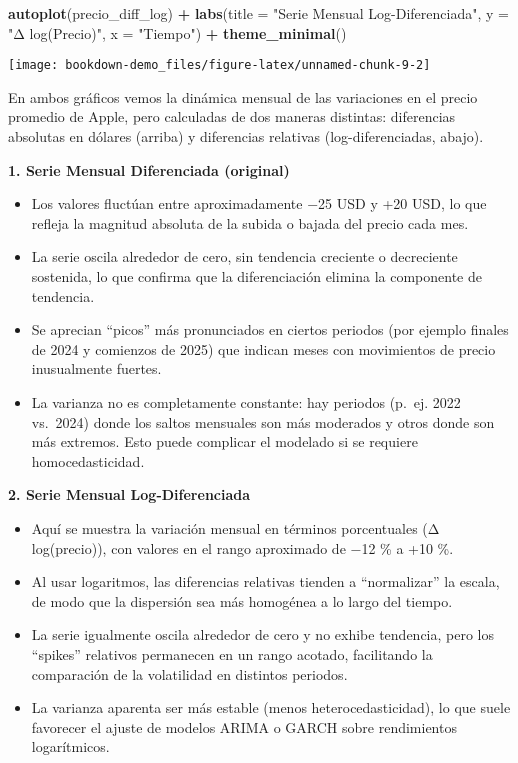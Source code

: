 \documentclass[
  11pt,
]{book}
\newenvironment{Shaded}{\begin{snugshade}}{\end{snugshade}}
\newcommand{\AttributeTok}[1]{\textcolor[rgb]{0.13,0.29,0.53}{#1}}
\newcommand{\FunctionTok}[1]{\textcolor[rgb]{0.13,0.29,0.53}{\textbf{#1}}}
\newcommand{\NormalTok}[1]{#1}
\newcommand{\SpecialCharTok}[1]{\textcolor[rgb]{0.81,0.36,0.00}{\textbf{#1}}}
\newcommand{\StringTok}[1]{\textcolor[rgb]{0.31,0.60,0.02}{#1}}
\begin{document}
\begin{Shaded}
\begin{Highlighting}[]
\FunctionTok{autoplot}\NormalTok{(precio\_diff\_log) }\SpecialCharTok{+}
  \FunctionTok{labs}\NormalTok{(}\AttributeTok{title =} \StringTok{"Serie Mensual Log{-}Diferenciada"}\NormalTok{,}
       \AttributeTok{y =} \StringTok{"Δ log(Precio)"}\NormalTok{, }\AttributeTok{x =} \StringTok{"Tiempo"}\NormalTok{) }\SpecialCharTok{+}
  \FunctionTok{theme\_minimal}\NormalTok{()}
\end{Highlighting}
\end{Shaded}

\begin{center}\texttt{[image: bookdown-demo\_files/figure-latex/unnamed-chunk-9-2]} \end{center}

En ambos gráficos vemos la dinámica mensual de las variaciones en el precio promedio de Apple, pero calculadas de dos maneras distintas: diferencias absolutas en dólares (arriba) y diferencias relativas (log-diferenciadas, abajo).

\textbf{1. Serie Mensual Diferenciada (original)}

\begin{itemize}
\item
  Los valores fluctúan entre aproximadamente −25 USD y +20 USD, lo que refleja la magnitud absoluta de la subida o bajada del precio cada mes.
\item
  La serie oscila alrededor de cero, sin tendencia creciente o decreciente sostenida, lo que confirma que la diferenciación elimina la componente de tendencia.
\item
  Se aprecian ``picos'' más pronunciados en ciertos periodos (por ejemplo finales de 2024 y comienzos de 2025) que indican meses con movimientos de precio inusualmente fuertes.
\item
  La varianza no es completamente constante: hay periodos (p.~ej. 2022 vs.~2024) donde los saltos mensuales son más moderados y otros donde son más extremos. Esto puede complicar el modelado si se requiere homocedasticidad.
\end{itemize}

\textbf{2. Serie Mensual Log-Diferenciada}

\begin{itemize}
\item
  Aquí se muestra la variación mensual en términos porcentuales (Δ log(precio)), con valores en el rango aproximado de −12 \% a +10 \%.
\item
  Al usar logaritmos, las diferencias relativas tienden a ``normalizar'' la escala, de modo que la dispersión sea más homogénea a lo largo del tiempo.
\item
  La serie igualmente oscila alrededor de cero y no exhibe tendencia, pero los ``spikes'' relativos permanecen en un rango acotado, facilitando la comparación de la volatilidad en distintos periodos.
\item
  La varianza aparenta ser más estable (menos heterocedasticidad), lo que suele favorecer el ajuste de modelos ARIMA o GARCH sobre rendimientos logarítmicos.
\end{itemize}
\end{document}
